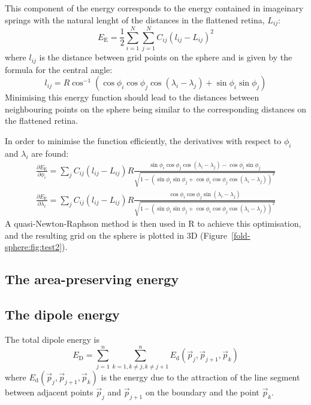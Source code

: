 \documentclass{article}
\newcommand{\EE}{\ensuremath{E_\mathrm{E}}\xspace}
\newcommand{\ED}{\ensuremath{E_\mathrm{D}}\xspace}
\newcommand{\Ed}{\ensuremath{E_\mathrm{d}}\xspace}
\newcommand{\p}{\vec{p}}
\begin{document}
This component of the energy corresponds to the energy contained in
imageinary springs with the natural lenght of the distances in the
flattened retina, $L_{ij}$:
\begin{equation}
  \label{fold-sphere:eq:5}
  \EE  = \frac{1}{2} \sum_{i=1}^N \sum_{j=1}^N C_{ij} (l_{ij}-L_{ij})^2  
\end{equation}
where $l_{ij}$ is the distance between grid points on the sphere and
is given by the formula for the central angle:
\begin{equation}
  \label{fold-sphere:eq:2}
  l_{ij} = R\cos^{-1}(\cos\phi_i\cos\phi_j\cos(\lambda_i-\lambda_j) + \sin\phi_i\sin\phi_j)
\end{equation}
Minimising this energy function should lead to the distances between
neighbouring points on the sphere being similar to the corresponding
distances on the flattened retina.

In order to minimise the function efficiently, the derivatives with
respect to $\phi_i$ and $\lambda_i$ are found:
\begin{equation}
  \label{fold-sphere:eq:3}
  \begin{split}
    \frac{\partial \EE}{\partial\phi_i} = 
    \sum_j C_{ij} (l_{ij} - L_{ij})R
    \frac{\sin\phi_i\cos\phi_j\cos(\lambda_i-\lambda_j) - \cos\phi_i\sin\phi_j}
    {\sqrt{1-(\sin\phi_i\sin\phi_j +
        \cos\phi_i\cos\phi_j\cos(\lambda_i-\lambda_j))^2}} \\
    \frac{\partial \EE}{\partial\lambda_i} = 
    \sum_j C_{ij} (l_{ij} - L_{ij})R
    \frac{\cos\phi_i\cos\phi_j\sin(\lambda_i-\lambda_j)}
    {\sqrt{1-(\sin\phi_i\sin\phi_j + \cos\phi_i\cos\phi_j\cos(\lambda_i-\lambda_j))^2}}
  \end{split}
\end{equation}
A quasi-Newton-Raphson method is then used in R to achieve this
optimisation, and the resulting grid on the sphere is plotted in 3D
(Figure~\ref{fold-sphere:fig:test2}).

\subsection{The area-preserving energy}
\label{fold-sphere:sec:area-pres-energy}

\subsection{The dipole energy}
\label{fold-sphere:sec:dipole-energy}

The total dipole energy is
\begin{equation}
  \label{fold-sphere:eq:6}
  \ED = \sum_{j=1}^n \sum_{k=1, k\ne j, k\ne j+1}^n \Ed(\p_j,
    \p_{j+1}, \p_k)
\end{equation}
where $\Ed(\p_j,\p_{j+1}, \p_k)$ is the energy due to
the attraction of the line segment between adjacent points $\p_j$ and
$\p_{j+1}$ on the boundary and the point $\p_k$.
\end{document}
